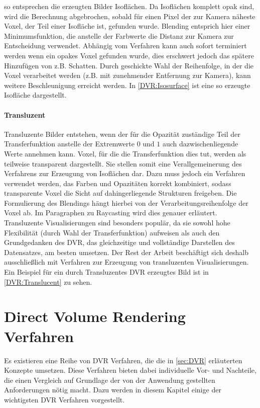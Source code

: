 \documentclass[a4paper,fontsize=12pt,toc=bib,halfparskip,ngerman]{scrartcl}
\begin{document}
so entsprechen die erzeugten Bilder Isofl\"achen. Da Isofl\"achen komplett opak sind, wird die Berechnung abgebrochen, sobald f\"ur einen Pixel der zur Kamera n\"aheste Voxel, der Teil einer Isofl\"ache ist, gefunden wurde. Blending entsprich hier einer Minimumsfunktion, die anstelle der Farbwerte die Distanz zur Kamera zur Entscheidung verwendet. Abh\"angig vom Verfahren kann auch sofort terminiert werden wenn ein opakes Voxel gefunden wurde, dies erschwert jedoch das sp\"atere Hinzuf\"ugen von z.B. Schatten. Durch geschickte Wahl der Reihenfolge, in der die Voxel verarbeitet werden (z.B. mit zunehmender Entfernung zur Kamera), kann weitere Beschleunigung erreicht werden. In \cref{DVR:Isosurface} ist eine so erzeugte Isofl\"ache dargestellt.

\paragraph{Transluzent}
Transluzente Bilder entstehen, wenn der f\"ur die Opazit\"at zust\"andige Teil der Transferfunktion anstelle der Extremwerte $0$ und $1$ auch dazwischenliegende Werte annehmen kann. Voxel, f\"ur die die Transferfunktion dies tut, werden als teilweise transparent dargestellt. Sie stellen somit eine Verallgemeinerung des Verfahrens zur Erzeugung von Isofl\"achen dar. Dazu muss jedoch ein Verfahren verwendet werden, das Farben und Opazit\"aten korrekt kombiniert, sodass transparente Voxel die Sicht auf dahingerliegende Strukturen freigeben. Die Formulierung des Blendings h\"angt hierbei von der Verarbeitungsreihenfolge der Voxel ab. Im Paragraphen zu Raycasting wird dies genauer erl\"autert. Transluzente Visualisierungen sind besonders popul\"ar, da sie sowohl hohe Flexibilit\"at (durch Wahl der Transferfunktion) aufweisen als auch den Grundgedanken des DVR, das gleichzeitige und vollst\"andige Darstellen des Datensatzes, am besten umsetzen. Der Rest der Arbeit besch\"aftigt sich deshalb ausschlie{\ss}lich mit Verfahren zur Erzeugung von transluzenten Visualisierungen. Ein Beispiel f\"ur ein durch Transluzentes DVR erzeugtes Bild ist in \cref{DVR:Translucent} zu sehen. 

\section{Direct Volume Rendering Verfahren}
Es existieren eine Reihe von DVR Verfahren, die die in \cref{sec:DVR} erl\"auterten Konzepte umsetzen. Diese Verfahren bieten dabei individuelle Vor- und Nachteile, die einen Vergleich auf Grundlage der von der Anwendung gestellten Anforderungen n\"otig macht. Dazu werden in diesem Kapitel einige der wichtigsten DVR Verfahren vorgestellt.
\end{document}
